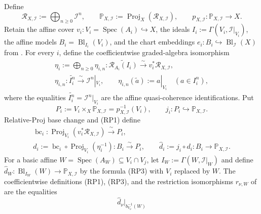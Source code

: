 \begin{definition}
  Define
  \[
    \mathscr R_{X,\mathcal I}:=\bigoplus_{n\ge0}\mathcal I^n,\qquad
    \mathbb P_{X,\mathcal I}:=
      \operatorname{Proj}_X(\mathscr R_{X,\mathcal I}),\qquad
    p_{X,\mathcal I}\colon\mathbb P_{X,\mathcal I}\to X.       \tag{RP0}
  \]
  Retain the affine cover
  $v_i\colon V_i=\operatorname{Spec}(A_i)\hookrightarrow X$, the ideals
  $I_i:=\Gamma(V_i,\mathcal I|_{V_i})$, the affine models
  $B_i=\operatorname{Bl}_{I_i}(V_i)$, and the chart embeddings
  $e_i\colon B_i\hookrightarrow\operatorname{Bl}_{\mathcal I}(X)$ from
  .  For every $i$, define the coefficientwise
  graded-algebra isomorphism
  \[
  \begin{gathered}
    \eta_i:=\bigoplus_{n\ge0}\eta_{i,n}\colon
      \widetilde{\mathcal R_{A_i}(I_i)}
      \xrightarrow{\ \sim\ }v_i^*\mathscr R_{X,\mathcal I},\\
    \eta_{i,n}\colon\widetilde{I_i^n}
      \xrightarrow{\ \sim\ }\mathcal I^n|_{V_i},\qquad
    \eta_{i,n}(\widetilde a):=a|_{V_i}\quad(a\in I_i^n),
  \end{gathered}                                               \tag{RP1}
  \]
  where the equalities
  $\widetilde{I_i^n}=\mathcal I^n|_{V_i}$ are the affine
  quasi-coherence identifications.  Put
  \[
    P_i:=V_i\times_X\mathbb P_{X,\mathcal I}
      =p_{X,\mathcal I}^{-1}(V_i),\qquad
    j_i\colon P_i\hookrightarrow\mathbb P_{X,\mathcal I}.      \tag{RP2}
  \]
  Relative-Proj base change
  \cite[\href{https://stacks.math.columbia.edu/tag/01O3}{Tag 01O3}]
  {stacks-project} and (RP1) define
  \[
  \begin{gathered}
    \operatorname{bc}_i\colon
      \operatorname{Proj}_{V_i}(v_i^*\mathscr R_{X,\mathcal I})
      \xrightarrow{\ \sim\ }P_i,\\
    d_i:=
      \operatorname{bc}_i\circ
      \operatorname{Proj}_{V_i}(\eta_i^{-1})\colon
      B_i\xrightarrow{\ \sim\ }P_i,\qquad
    \widehat d_i:=j_i\circ d_i\colon B_i\to\mathbb P_{X,\mathcal I}.
  \end{gathered}                                               \tag{RP3}
  \]
  For a basic affine $W=\operatorname{Spec}(A_W)\subseteq V_i\cap V_j$,
  let $I_W:=\Gamma(W,\mathcal I|_W)$ and define
  $\widehat d_W\colon\operatorname{Bl}_{I_W}(W)\to
  \mathbb P_{X,\mathcal I}$ by the formula (RP3) with $V_i$ replaced by
  $W$.  The coefficientwise definitions (RP1), (RP3), and the restriction
  isomorphisms $r_{\nu,W}$ of
   are the equalities
  \[
    \widehat d_\nu|_{b_{V_\nu}^{-1}(W)}
\]
\end{definition}
